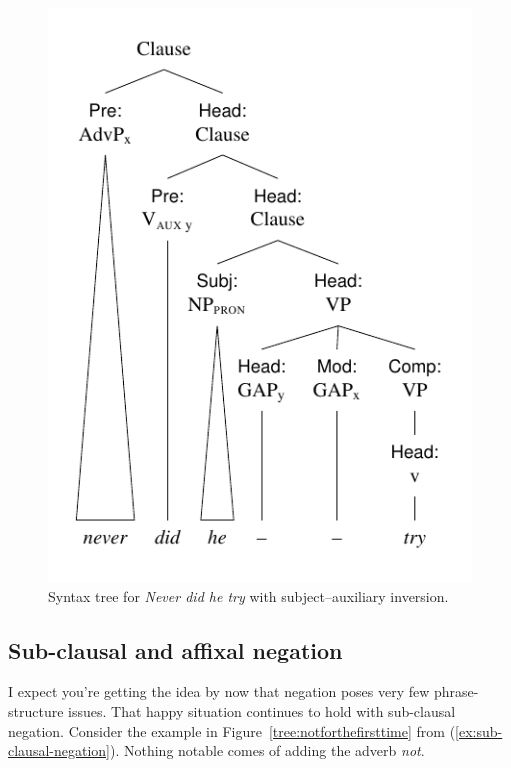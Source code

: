\begin{figure}
    \centering
    \includegraphics{figures/neverdidhe.pdf}
    \caption{Syntax tree for \textit{Never did he try} with subject--auxiliary inversion.}
    \label{tree:neverdidhe}
\end{figure}

\subsection{Sub-clausal and affixal negation}

I expect you're getting the idea by now that negation poses very few phrase-structure issues. That happy situation continues to hold with sub-clausal negation. Consider the example in Figure~\ref{tree:notforthefirsttime} from (\ref{ex:sub-clausal-negation}). Nothing notable comes of adding the adverb \textit{not}.

